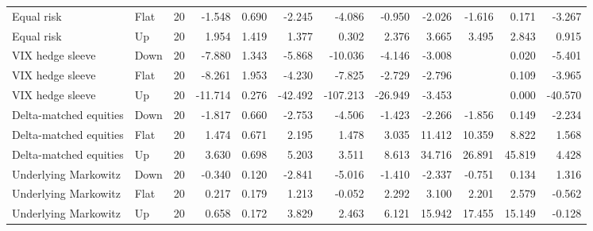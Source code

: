 \begin{tabular}{llrrrrrrrrrr}
Equal risk & Flat & 20 & -1.548 & 0.690 & -2.245 & -4.086 & -0.950 & -2.026 & -1.616 & 0.171 & -3.267 \\
Equal risk & Up & 20 & 1.954 & 1.419 & 1.377 & 0.302 & 2.376 & 3.665 & 3.495 & 2.843 & 0.915 \\
VIX hedge sleeve & Down & 20 & -7.880 & 1.343 & -5.868 & -10.036 & -4.146 & -3.008 &  & 0.020 & -5.401 \\
VIX hedge sleeve & Flat & 20 & -8.261 & 1.953 & -4.230 & -7.825 & -2.729 & -2.796 &  & 0.109 & -3.965 \\
VIX hedge sleeve & Up & 20 & -11.714 & 0.276 & -42.492 & -107.213 & -26.949 & -3.453 &  & 0.000 & -40.570 \\
Delta-matched equities & Down & 20 & -1.817 & 0.660 & -2.753 & -4.506 & -1.423 & -2.266 & -1.856 & 0.149 & -2.234 \\
Delta-matched equities & Flat & 20 & 1.474 & 0.671 & 2.195 & 1.478 & 3.035 & 11.412 & 10.359 & 8.822 & 1.568 \\
Delta-matched equities & Up & 20 & 3.630 & 0.698 & 5.203 & 3.511 & 8.613 & 34.716 & 26.891 & 45.819 & 4.428 \\
Underlying Markowitz & Down & 20 & -0.340 & 0.120 & -2.841 & -5.016 & -1.410 & -2.337 & -0.751 & 0.134 & 1.316 \\
Underlying Markowitz & Flat & 20 & 0.217 & 0.179 & 1.213 & -0.052 & 2.292 & 3.100 & 2.201 & 2.579 & -0.562 \\
Underlying Markowitz & Up & 20 & 0.658 & 0.172 & 3.829 & 2.463 & 6.121 & 15.942 & 17.455 & 15.149 & -0.128 \\
\bottomrule
\end{tabular}
